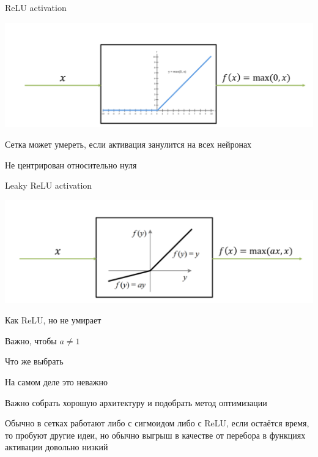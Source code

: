 \documentclass[notes,12pt, aspectratio=169]{beamer}
\newenvironment{wideitemize}{\itemize\addtolength{\itemsep}{10pt}}{\enditemize}
\begin{document}
\begin{frame}{ReLU activation}
\begin{center}
	\includegraphics[width=.8\linewidth]{relu_activation.png}
\end{center}

\begin{itemize}
	{ \color{red} 
		\item  Сетка может умереть, если активация занулится на всех нейронах
		
		\item  Не центрирован относительно нуля
	} 
\end{itemize}
\end{frame}


\begin{frame}{Leaky ReLU activation}
\begin{center}
	\includegraphics[width=.7\linewidth]{leaky_relu_activation.png}
\end{center}

\begin{itemize}
	{ \color{green} 
	\item  Как ReLU, но не умирает
	\item Важно, чтобы $a \ne 1$
} 
\end{itemize}
\end{frame}


\begin{frame}{Что же выбрать}
\begin{wideitemize}
	\item  На самом деле это неважно
	
	\item Важно собрать хорошую архитектуру и подобрать метод оптимизации
	
	\item Обычно в сетках работают либо с сигмоидом либо с ReLU, если остаётся время, то пробуют другие идеи, но обычно выгрыш в качестве от перебора в функциях активации довольно низкий
\end{wideitemize}
\end{frame}
\end{document}
